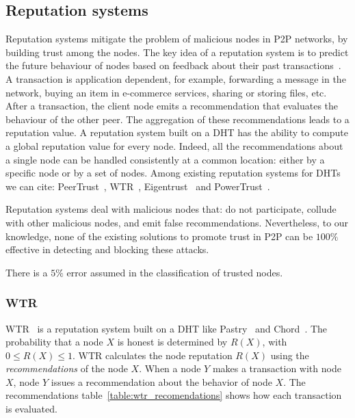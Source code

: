 \subsection{Reputation systems}
\label{sec:reputation_systems}
Reputation systems mitigate the problem of malicious nodes in
P2P networks, by building trust among the nodes. The key
idea of a reputation system is to predict the future behaviour
of nodes based on feedback about their past
transactions~\cite{Resnick:2000:RS:355112.355122}. A
transaction is application dependent, for example, forwarding a
message in the network, buying an item in e-commerce services,
sharing or storing files, etc. After a transaction, the client node emits
a recommendation that evaluates the behaviour of the other peer.
The aggregation of these recommendations leads to a reputation
value.
A reputation system built on a DHT has the ability
to compute a global reputation value for every node. Indeed,
all the recommendations about a single node can be handled
consistently at a common location: either by a specific node
or by a set of nodes. Among existing reputation systems for
DHTs we can cite: PeerTrust~\cite{xiong2004peertrust}, WTR~\cite{bonnaire2009wtr},
Eigentrust~\cite{kamvar2003eigentrust} and
PowerTrust~\cite{rahbar2007powertrust}.

Reputation systems deal with malicious nodes that:
do not participate, collude with other malicious nodes, and
emit false recommendations. Nevertheless, to our knowledge,
none of the existing solutions to promote trust in P2P can be
$100\%$ effective in detecting and blocking these attacks.

There is a $5\%$ error assumed in the classification of trusted nodes.

\subsubsection{WTR}
\label{sec:wtr}
WTR~\cite{bonnaire2009wtr} is a reputation system built on a DHT like Pastry~\cite{pastry} and
Chord~\cite{chord}. The probability that a node $X$ is honest is determined by
$R(X)$, with $0 \leq R(X) \leq 1$. WTR calculates the node reputation $R(X)$
using the \textit{recommendations} of the node $X$. When a node $Y$ makes a transaction with
node $X$, node $Y$ issues a recommendation about the behavior of node
$X$. The recommendations table~\ref{table:wtr_recomendations} shows how each
transaction is evaluated.
 
